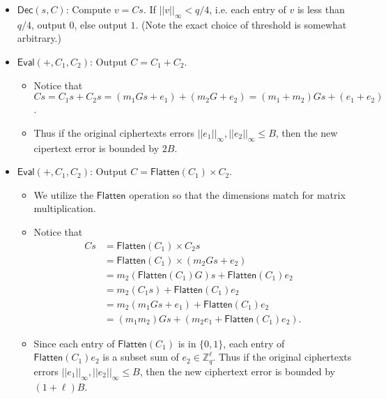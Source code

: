 \begin{itemize}
    \item $\mathsf{Dec}(s, C)$: Compute $v = Cs$. If $||v||_\infty < q/4$, i.e. each entry of $v$ is less than $q/4$, output $0$, else output $1$. (Note the exact choice of threshold is somewhat arbitrary.)
    
    \item $\mathsf{Eval}(+, C_1, C_2)$: Output $C = C_1 + C_2$. 

    \begin{itemize}
        \item Notice that $Cs = C_1s + C_2s = (m_1 Gs + e_1) + (m_2 G + e_2) = (m_1 + m_2) Gs + (e_1 + e_2)$. 

        \item Thus if the original ciphertexts errors $||e_1||_{\infty}, ||e_2||_{\infty} \leq B$, then the new cipertext error is bounded by $2B$. 
    \end{itemize} 

    \item $\mathsf{Eval}(+, C_1, C_2)$: Output $C = \mathsf{Flatten}(C_1) \times C_2$. 

    \begin{itemize}
        \item We utilize the $\mathsf{Flatten}$ operation so that the dimensions match for matrix multiplication. 

        \item Notice that 
        \begin{align*}
            Cs & = \mathsf{Flatten}(C_1) \times C_2 s \\
            & = \mathsf{Flatten}(C_1) \times (m_2 G s + e_2) \\ 
            & = m_2 (\mathsf{Flatten}(C_1) G) s + \mathsf{Flatten}(C_1) e_2 \\ 
            & = m_2 (C_1 s) + \mathsf{Flatten}(C_1) e_2 \\
            & = m_2 (m_1 Gs + e_1) + \mathsf{Flatten}(C_1) e_2 \\ 
            & = (m_1 m_2) G s + (m_2 e_1 + \mathsf{Flatten}(C_1) e_2). 
        \end{align*} 

        \item Since each entry of $\mathsf{Flatten}(C_1)$ is in $\{0,1\}$, each entry of $\mathsf{Flatten}(C_1) e_2$ is a subset sum of $e_2 \in \mathbb{Z}_q^{\ell}$. Thus if the original ciphertexts errors $||e_1||_{\infty}, ||e_2||_{\infty} \leq B$, then the new ciphertext error is bounded by $(1+\ell)B$. 
    \end{itemize}
\end{itemize}

